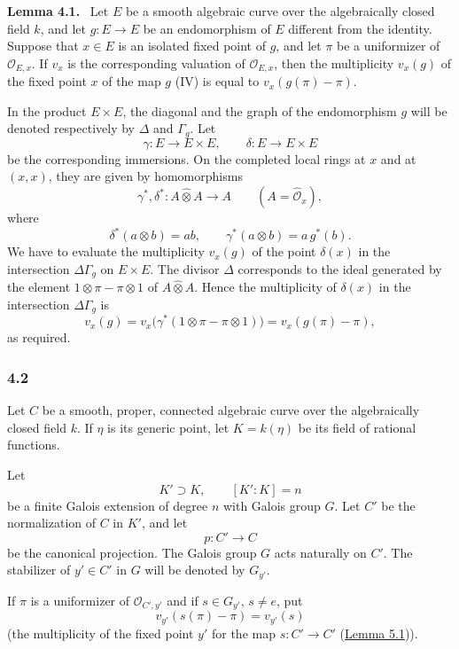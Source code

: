 \documentclass[11pt]{article}
\newenvironment{statement}[1]{\par\medskip\noindent\textbf{#1.}\ }{\par\medskip}
\begin{document}
\label{sga5:X:lemma:4.1}\begin{statement}{Lemma 4.1}
Let $E$ be a smooth algebraic curve over the algebraically closed field $k$, and let $g:E\to E$ be an endomorphism of $E$ different from the identity. Suppose that $x\in E$ is an isolated fixed point of $g$, and let $\pi$ be a uniformizer of $\mathcal O_{E,x}$. If $v_x$ is the corresponding valuation of $\mathcal O_{E,x}$, then the multiplicity $v_x(g)$ of the fixed point $x$ of the map $g$ (IV) is equal to $v_x(g(\pi)-\pi)$.
\end{statement}


In the product $E\times E$, the diagonal and the graph of the endomorphism $g$ will be denoted respectively by $\Delta$ and $\Gamma_g$. Let
\[
\gamma:E\longrightarrow E\times E,\qquad
\delta:E\longrightarrow E\times E
\]
be the corresponding immersions. On the completed local rings at $x$ and at $(x,x)$, they are given by homomorphisms
\[
\gamma^*,\delta^*:A\widehat\otimes A\longrightarrow A
\qquad (A=\widehat{\mathcal O}_x),
\]
where
\[
\delta^*(a\otimes b)=ab,\qquad
\gamma^*(a\otimes b)=a\,g^*(b).
\]
We have to evaluate the multiplicity $v_x(g)$ of the point $\delta(x)$ in the intersection $\Delta\Gamma_g$ on $E\times E$. The divisor $\Delta$ corresponds to the ideal generated by the element $1\otimes\pi-\pi\otimes1$ of $A\widehat\otimes A$. Hence the multiplicity of $\delta(x)$ in the intersection $\Delta\Gamma_g$ is
\[
v_x(g)=v_x\bigl(\gamma^*(1\otimes\pi-\pi\otimes1)\bigr)
      =v_x(g(\pi)-\pi),
\]
as required.

\subsubsection*{4.2}\label{sga5:X:subsubsection:4.2}

Let $C$ be a smooth, proper, connected algebraic curve over the algebraically closed field $k$. If $\eta$ is its generic point, let $K=k(\eta)$ be its field of rational functions.

Let
\[
K'\supset K,\qquad [K':K]=n
\]
be a finite Galois extension of degree $n$ with Galois group $G$. Let $C'$ be the normalization of $C$ in $K'$, and let
\[
p:C'\longrightarrow C
\]
be the canonical projection. The Galois group $G$ acts naturally on $C'$. The stabilizer of $y'\in C'$ in $G$ will be denoted by $G_{y'}$.

If $\pi$ is a uniformizer of $\mathcal O_{C',y'}$ and if $s\in G_{y'}$, $s\ne e$, put
\[
v_{y'}(s(\pi)-\pi)=v_{y'}(s)
\tag{4.2.1}\label{sga5:X:equation:4.2.1}
\]
(the multiplicity of the fixed point $y'$ for the map $s:C'\to C'$ (\hyperref[sga5:X:lemma:4.1]{Lemma 5.1})).
\end{document}
